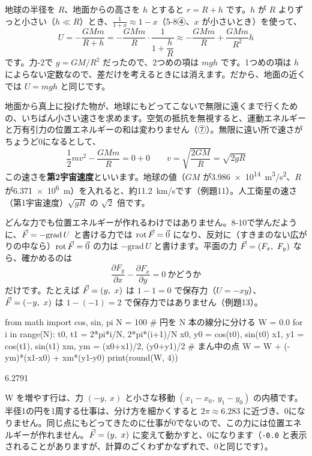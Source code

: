 地球の半径を $R$、地面からの高さを $h$ とすると $r=R+h$ です。$h$ が $R$ よりずっと小さい（$h\ll R$）とき、$\tfrac{1}{1+x}\approx1-x$（\mbox{5-8④}、$x$ が小さいとき）を使って、
\[U=-\frac{GMm}{R+h}=-\frac{GMm}{R}\cdot\frac{1}{1+\dfrac{h}{R}}\approx-\frac{GMm}{R}+\frac{GMm}{R^2}h\]
です。力-2で $g=GM/R^2$ だったので、2つめの項は $mgh$ です。1つめの項は $h$ によらない定数なので、差だけを考えるときには消えます。だから、地面の近くでは $U=mgh$ と同じです。

\begin{phflow}[位置エネルギー]
\end{phflow}

\label{ph:力-4:uchuu}地面から真上に投げた物が、地球にもどってこないで無限に遠くまで行くための、いちばん小さい速さを求めます。空気の抵抗を無視すると、運動エネルギーと万有引力の位置エネルギーの和は変わりません（⑦）。無限に遠い所で速さがちょうど0になるとして、
\[\frac{1}{2}mv^2-\frac{GMm}{R}=0+0\qquad v=\sqrt{\frac{2GM}{R}}=\sqrt{2gR}\]
この速さを\textbf{第2宇宙速度}といいます。地球の値（$GM$ が\qty{3.986e14}{m^3/s^2}、$R$ が\qty{6.371e6}{m}）を入れると、約\qty{11.2}{km/s}です（例題11）。人工衛星の速さ（第1宇宙速度）$\sqrt{gR}$ の $\sqrt2$ 倍です。

どんな力でも位置エネルギーが作れるわけではありません。8-10で学んだように、$\vec{F}=-\mathrm{grad}\,U$ と書ける力では $\mathrm{rot}\,\vec{F}=\vec{0}$ になり、反対に（すきまのない広がりの中なら）$\mathrm{rot}\,\vec{F}=\vec{0}$ の力は $-\mathrm{grad}\,U$ と書けます。平面の力 $\pxev F=(F_x,\ F_y)$ なら、確かめるのは
\[\frac{\partial F_y}{\partial x}-\frac{\partial F_x}{\partial y}=0\ \text{かどうか}\]
だけです。たとえば $\vec{F}=(y,\ x)$ は $1-1=0$ で保存力（$U=-xy$）、$\vec{F}=(-y,\ x)$ は $1-(-1)=2$ で保存力ではありません（例題13）。

\begin{phcode}
from math import cos, sin, pi
N = 100                  \# 円を N 本の線分に分ける
W = 0.0
for i in range(N):
    t0, t1 = 2*pi*i/N, 2*pi*(i+1)/N
    x0, y0 = cos(t0), sin(t0)
    x1, y1 = cos(t1), sin(t1)
    xm, ym = (x0+x1)/2, (y0+y1)/2  \# まん中の点
    W = W + (-ym)*(x1-x0) + xm*(y1-y0)
print(round(W, 4))
\end{phcode}
\begin{phcodeout}
6.2791
\end{phcodeout}
W を増やす行は、力 $(-y,\ x)$ と小さな移動 $(x_1-x_0,\ y_1-y_0)$ の内積です。半径1の円を1周する仕事は、分け方を細かくすると $2\pi\approx6.283$ に近づき、0になりません。同じ点にもどってきたのに仕事が0でないので、この力には位置エネルギーが作れません。$\vec{F}=(y,\ x)$ に変えて動かすと、0になります（\texttt{-0.0} と表示されることがありますが、計算のごくわずかなずれで、0と同じです）。

